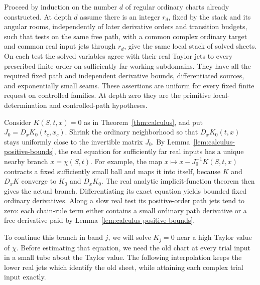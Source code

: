 Proceed by induction on the number $d$ of regular ordinary charts already
constructed.  At depth $d$ assume there is an integer $r_d$, fixed by the
stack and its angular rooms, independently of later derivative orders
and transition budgets, such that tests on the same free path, with a common complex ordinary target
and common real input jets through $r_d$, give the same local stack of
solved sheets.  On each test the solved variables agree with their real
Taylor jets to every prescribed finite order on sufficiently far working
subdomains.  They have all the required fixed path and independent
derivative bounds, differentiated sources, and exponentially small seams.
These assertions are uniform for every fixed finite request on controlled
families.  At depth zero they are the primitive local-determination and
controlled-path hypotheses.

Consider $K(S,t,x)=0$ as in Theorem~\ref{thm:calculus}, and put
$J_0=D_xK_0(t_c,x_c)$.  Shrink the ordinary neighborhood so that
$D_xK_0(t,x)$ stays uniformly close to the invertible matrix $J_0$.  By
Lemma~\ref{lem:calculus-positive-bounds}, the real equation for sufficiently
far real inputs has a unique nearby branch $x=\chi(S,t)$.  For example,
the map $x\mapsto x-J_0^{-1}K(S,t,x)$ contracts a fixed sufficiently
small ball and maps it into itself, because $K$ and $D_xK$ converge to
$K_0$ and $D_xK_0$.  The real analytic implicit-function theorem then gives
the actual branch.  Differentiating its exact equation yields bounded
fixed ordinary derivatives.  Along a slow real test its positive-order
path jets tend to zero: each chain-rule term either contains a small
ordinary path derivative or a free derivative paid by
Lemma~\ref{lem:calculus-positive-bounds}.

To continue this branch in band $j$, we will solve $K_j=0$ near a high
Taylor value of $\chi$.  Before estimating that equation, we need the old
chart at every trial input in a small tube about the Taylor value.
The following interpolation keeps the lower real jets which identify
the old sheet, while attaining each complex trial input exactly.

